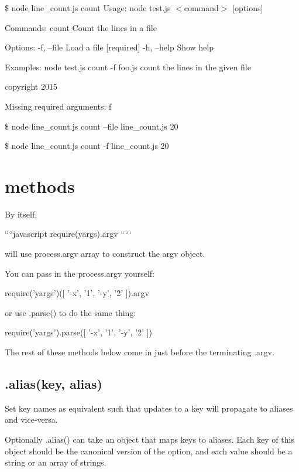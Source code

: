  \$ node line\+\_\+count.\+js count Usage\+: node test.\+js $<$command$>$ \mbox{[}options\mbox{]}

Commands\+: count Count the lines in a file

Options\+: -\/f, --file Load a file \mbox{[}required\mbox{]} -\/h, --help Show help

Examples\+: node test.\+js count -\/f foo.\+js count the lines in the given file

copyright 2015

Missing required arguments\+: f

\$ node line\+\_\+count.\+js count --file line\+\_\+count.\+js 20

\$ node line\+\_\+count.\+js count -\/f line\+\_\+count.\+js 20

\section*{methods }

By itself,

````javascript require(\textquotesingle{}yargs\textquotesingle{}).argv `````

will use {\ttfamily process.\+argv} array to construct the {\ttfamily argv} object.

You can pass in the {\ttfamily process.\+argv} yourself\+:


\begin{DoxyCode}
require('yargs')([ '-x', '1', '-y', '2' ]).argv
\end{DoxyCode}


or use .parse() to do the same thing\+:


\begin{DoxyCode}
require('yargs').parse([ '-x', '1', '-y', '2' ])
\end{DoxyCode}


The rest of these methods below come in just before the terminating {\ttfamily .argv}.

\subsection*{.alias(key, alias) }

Set key names as equivalent such that updates to a key will propagate to aliases and vice-\/versa.

Optionally {\ttfamily .alias()} can take an object that maps keys to aliases. Each key of this object should be the canonical version of the option, and each value should be a string or an array of strings.

